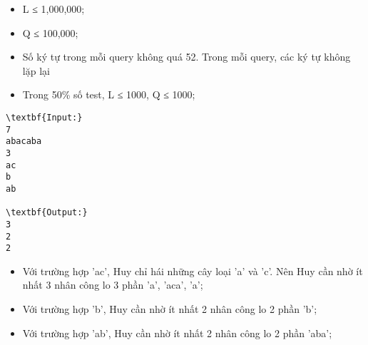 \begin{itemize}
	\item L ≤ 1,000,000;
	\item Q ≤ 100,000;
	\item Số ký tự trong mỗi query không quá 52. Trong mỗi query, các ký tự không lặp lại
	\item Trong 50\% số test, L ≤ 1000, Q ≤ 1000;
\end{itemize}
\begin{verbatim}
\textbf{Input:}
7
abacaba
3
ac
b
ab

\textbf{Output:}
3
2
2
\end{verbatim}
\begin{itemize}
	\item Với trường hợp 'ac', Huy chỉ hái những cây loại 'a' và 'c'. Nên Huy cần nhờ ít nhất 3 nhân công lo 3 phần 'a', 'aca', 'a';
	\item Với trường hợp 'b', Huy cần nhờ ít nhất 2 nhân công lo 2 phần 'b';
	\item Với trường hợp 'ab', Huy cần nhờ ít nhất 2 nhân công lo 2 phần 'aba';
\end{itemize}
